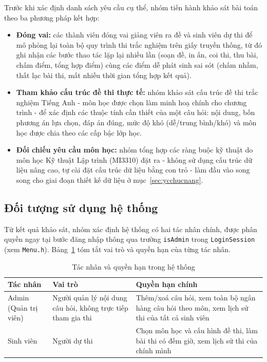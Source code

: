 \documentclass[11pt]{report}
\begin{document}
Trước khi xác định danh sách yêu cầu cụ thể, nhóm tiến hành khảo sát bài toán theo ba phương pháp kết hợp:

\begin{itemize}[leftmargin=*]
    \item \textbf{Đóng vai:} các thành viên đóng vai giảng viên ra đề và sinh viên dự thi để mô phỏng lại toàn bộ quy trình thi trắc nghiệm trên giấy truyền thống, từ đó ghi nhận các bước thao tác lặp lại nhiều lần (soạn đề, in ấn, coi thi, thu bài, chấm điểm, tổng hợp điểm) cùng các điểm dễ phát sinh sai sót (chấm nhầm, thất lạc bài thi, mất nhiều thời gian tổng hợp kết quả).
    \item \textbf{Tham khảo cấu trúc đề thi thực tế:} nhóm khảo sát cấu trúc đề thi trắc nghiệm Tiếng Anh - môn học được chọn làm minh hoạ chính cho chương trình - để xác định các thuộc tính cần thiết của một câu hỏi: nội dung, bốn phương án lựa chọn, đáp án đúng, mức độ khó (dễ/trung bình/khó) và môn học được chia theo các cấp bậc lớp học.
    \item \textbf{Đối chiếu yêu cầu môn học:} nhóm tổng hợp các ràng buộc kỹ thuật do môn học Kỹ thuật Lập trình (MI3310) đặt ra - không sử dụng cấu trúc dữ liệu nâng cao, tự cài đặt cấu trúc dữ liệu bằng con trỏ - làm đầu vào song song cho giai đoạn thiết kế dữ liệu ở mục~\ref{sec:ycchucnang}.
\end{itemize}

\subsection{Đối tượng sử dụng hệ thống}

Từ kết quả khảo sát, nhóm xác định hệ thống có hai tác nhân chính, được phân quyền ngay tại bước đăng nhập thông qua trường \texttt{isAdmin} trong \texttt{LoginSession} (xem \texttt{Menu.h}). Bảng~\ref{tab:actor} tóm tắt vai trò và quyền hạn của từng tác nhân.

\begin{table}[H]
    \centering
    \begin{tabularx}{\textwidth}{|l|X|X|} \hline
        \textbf{Tác nhân} & \textbf{Vai trò} & \textbf{Quyền hạn chính} \\ \hline
        Admin (Quản trị viên) & Người quản lý nội dung câu hỏi, không trực tiếp tham gia thi & Thêm/xoá câu hỏi, xem toàn bộ ngân hàng câu hỏi theo môn, xem lịch sử thi của tất cả sinh viên \\ \hline
        Sinh viên & Người dự thi & Chọn môn học và cấu hình đề thi, làm bài thi có đếm giờ, xem lịch sử thi của chính mình \\ \hline
    \end{tabularx}
    \caption{Tác nhân và quyền hạn trong hệ thống}
    \label{tab:actor}
\end{table}
\end{document}
